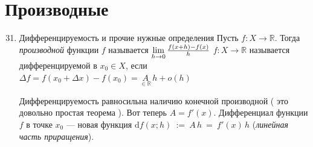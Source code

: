 \documentclass[a4paper,12pt]{article}
\newcommand\R{\mathbb{R}}
\newcommand\ilim{\lim\limits}
\theoremstyle{plain}
\theoremstyle{definition}
\theoremstyle{remark}
\def\resetdefs{ \setcounter{defn}{0}\setcounter{exmp}{0} }
\def\resetthrm{ \setcounter{thrm}{0}\setcounter{stat}{0} }
\def\resetrem{ \setcounter{rem}{0} }
\def\resetall{ \resetdefs \resetthrm \resetrem}
\begin{document}
\section*{Производные}
\begin{enumerate} 
\setcounter{enumi}{30}
  \item Дифференцируемость и прочие нужные определения
    \resetall
    {  Пусть $f : X \to \R$. Тогда \emph{производной} функции $f$ называется 
    $\ilim_{h\to 0}{f(x+h) - f(x) \over h}$ \label{def:derivative}}
    {  $f : X \to \R$ называется дифференцируемой в $x_0 \in X$, если 
    $\Delta f = f(x_0 + \Delta x) - f(x_0) = \underset{\in \R }{A}\,h + o(h)$  }
  
    Дифференцируемость равносильна наличию конечной производной ( это довольно простая теорема ).
    Вот теперь $A = f'(x)$.
    {  Дифференциал функции $f$ в точке $x_0 $ --- новая функция 
      $\mathrm{d}f(x;h)$~:=~$A\,h$~=~$f'(x)\,h$ (\textit{линейная часть приращения}).}
  

\end{enumerate}
\end{document}

